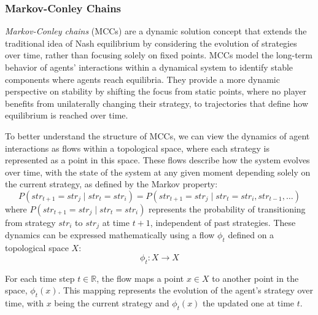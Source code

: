     \subsubsection{Markov-Conley Chains}

        \emph{Markov-Conley chains} (MCCs) are a dynamic solution concept that extends the traditional idea of Nash equilibrium by considering the evolution of strategies over time, rather than focusing solely on fixed points. MCCs model the long-term behavior of agents’ interactions within a dynamical system to identify stable components where agents reach equilibria. They provide a more dynamic perspective on stability by shifting the focus from static points, where no player benefits from unilaterally changing their strategy, to trajectories that define how equilibrium is reached over time.\tinydouble

        \noindent
        To better understand the structure of MCCs, we can view the dynamics of agent interactions as flows within a topological space, where each strategy is represented as a point in this space. These flows describe how the system evolves over time, with the state of the system at any given moment depending solely on the current strategy, as defined by the Markov property:
        \begin{equation}
            P(str_{t+1} = str_j \mid str_t = str_i) = P(str_{t+1} = str_j \mid str_t = str_i, str_{t-1}, \dots)
            \label{eq:markov_property}
        \end{equation}
        where $P(str_{t+1} = str_j \mid str_t = str_i)$ represents the probability of transitioning from strategy $str_i$ to $str_j$ at time $t+1$, independent of past strategies. These dynamics can be expressed mathematically using a flow $\phi_t$ defined on a topological space $X$:
        \begin{equation}
            \phi_t: X \rightarrow X
            \label{eq:flow_phi}
        \end{equation}

        \noindent
        For each time step $t \in \mathbb{R}$, the flow maps a point $x \in X$ to another point in the space, $\phi_t(x)$. This mapping represents the evolution of the agent’s strategy over time, with $x$ being the current strategy and $\phi_t(x)$ the updated one at time $t$.\tinydouble
        
